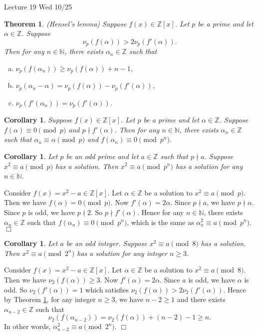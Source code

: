 \documentclass{article}
\def\Z{{\mathbb Z}}
\def\N{{\mathbb N}}
\def\Z{{\mathbb Z}}
\newtheorem{theorem}[subsection]{Theorem}
\newtheorem{cor}[subsection]{Corollary}
\newenvironment{proof}{\noindent {\bf Proof:}}{$\Box$ \vspace{2 ex}}
\newcommand{\add}[1]{{\color{blue} #1}}
\begin{document}
\begin{center}
    \add{Lecture 19 Wed 10/25}
\end{center}
\begin{theorem}\label{thm:hensel}
    (Hensel's lemma) Suppose $f(x)\in\Z[x]$. Let $p$ be a prime and let $\alpha\in \Z$. Suppose $$\nu_p(f(\alpha)) > 2\nu_p(f'(\alpha)).$$ Then for any $n\in\N$, there exists  $\alpha_n\in\Z$ such that
    \begin{enumerate}[(a)]
        \item $\nu_p(f(\alpha_n)) \geq \nu_p(f(\alpha)) + n-1$,
        \item $\nu_p(\alpha_n-\alpha) = \nu_p(f(\alpha))-\nu_p(f'(\alpha))$,
        \item $\nu_p(f'(\alpha_n)) = \nu_p(f'(\alpha))$.
    \end{enumerate} 
\end{theorem}

\begin{cor}
    Suppose $f(x)\in\Z[x]$. Let $p$ be a prime and let $\alpha\in \Z$. Suppose $f(\alpha)\equiv 0\pmod{p}$ and $p\nmid f'(\alpha)$. Then for any $n\in\N$, there exists $\alpha_n\in\Z$ such that $\alpha_n\equiv \alpha\pmod{p}$ and $f(\alpha_n)\equiv 0\pmod{p^n}.$
\end{cor}

\begin{cor}\label{cor:p2n}
    Let $p$ be an odd prime and let $a\in\Z$ such that $p\nmid a$. Suppose $x^2\equiv a\pmod{p}$ has a solution. Then $x^2\equiv a\pmod{p^n}$ has a solution for any $n\in\N$.
\end{cor}

\begin{proof}
    Consider $f(x) = x^2 - a \in\Z[x]$. Let $\alpha\in\Z$ be a solution to $x^2 \equiv a\pmod{p}$. Then we have $f(\alpha) = 0\pmod{p}$. Now $f'(\alpha) = 2\alpha$. Since $p\nmid a$, we have $p\nmid \alpha$. Since $p$ is odd, we have $p\nmid 2$. So $p\nmid f'(\alpha)$. Hence for any $n\in\N$, there exists $\alpha_n\in\Z$ such that $f(\alpha_n)\equiv 0\pmod{p^n}$, which is the same as $\alpha_n^2 \equiv a\pmod{p^n}.$
\end{proof}

\begin{cor}
    Let $a$ be an odd integer. Suppose $x^2\equiv a\pmod{8}$ has a solution. Then $x^2\equiv a\pmod{2^n}$ has a solution for any integer $n\geq 3$.
\end{cor}

\begin{proof}
    Consider $f(x) = x^2 - a \in\Z[x]$. Let $\alpha\in\Z$ be a solution to $x^2 \equiv a\pmod{8}$. Then we have $\nu_2(f(\alpha))\geq 3$. Now $f'(\alpha) = 2\alpha$. Since $a$ is odd, we have $\alpha$ is odd. So $\nu_2(f'(\alpha)) = 1$ which satisfies $\nu_2(f(\alpha)) > 2\nu_2(f'(\alpha))$.  Hence by Theorem \ref{thm:hensel}, for any integer $n\geq 3$, we have $n-2\geq 1$ and there exists $\alpha_{n-2}\in\Z$ such that $$\nu_2(f(\alpha_{n-2})) = \nu_2(f(\alpha)) + (n-2)-1 \geq n.$$
    In other words, $\alpha_{n-2}^2\equiv a\pmod{2^n}.$
\end{proof}
\end{document}
